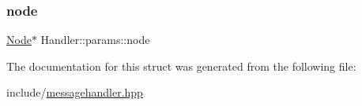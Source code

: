 \mbox{\label{structHandler_1_1params_a9c2d75c37d122d3b8186a5b37c1d2526}} 
\subsubsection{\texorpdfstring{node}{node}}
{\footnotesize\ttfamily \mbox{\hyperlink{classNode}{Node}}$\ast$ Handler\+::params\+::node}



The documentation for this struct was generated from the following file\+:\begin{DoxyCompactItemize}
\item 
include/\mbox{\hyperlink{messagehandler_8hpp}{messagehandler.\+hpp}}\end{DoxyCompactItemize}
